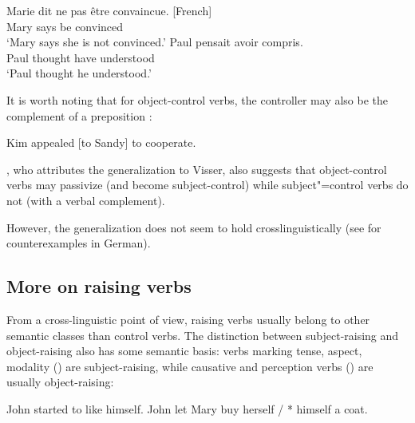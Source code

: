 \documentclass[output=paper
	        ,collection
	        ,collectionchapter
 	        ,biblatex
                ,babelshorthands
                ,newtxmath
                ,draftmode
                ,colorlinks, citecolor=brown
]{langscibook}
\begin{document}
\begin{exe}
\ex \begin{xlist}
\ex \gll Marie dit {ne pas} \^etre convaincue. [French] \\
Mary says  be convinced \\
\glt `Mary says she is not convinced.'	
\ex \gll Paul pensait  avoir compris. \\
Paul thought have understood \\
\glt `Paul thought he understood.'
 \end{xlist}
\end{exe}

It is worth noting that for object-control verbs, the controller may also be the complement of a preposition \citep[]{PollardandSag1994}:

\begin{exe}
\ex Kim appealed [to Sandy] to cooperate. \label{to}
\end{exe}


 
\citet[]{Bresnan82c}, who attributes the generalization to Visser, also suggests that object-control verbs may passivize (and become subject-control) while subject"=control verbs do not (with a verbal complement).

\eal
{}\label{persuade-pass}
\label{promise-pass}
\zl
However, the generalization does not seem to hold crosslinguistically (see  for counterexamples in German).
 
\subsection{More on raising verbs}

From a cross-linguistic point of view, raising verbs usually belong to other semantic classes than control verbs. The distinction between subject-raising and object-raising also has some semantic basis: verbs marking tense, aspect, modality () are subject-raising, while
causative and perception verbs () are usually object-raising:

	\begin{exe}
\ex  \begin{xlist}
\ex John started to like himself.
\ex John let Mary buy herself / * himself a coat.
	 \end{xlist}
	 \end{exe}
	
\end{document}
